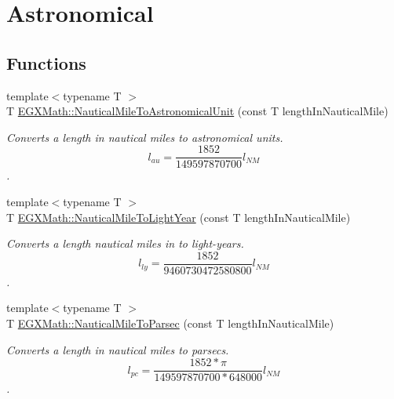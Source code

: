 \hypertarget{group___e_g_x_math-_conversions-_length_conversions-_nautical-_nautical_mile-_astronomical}{}\section{Astronomical}
\label{group___e_g_x_math-_conversions-_length_conversions-_nautical-_nautical_mile-_astronomical}
\subsection*{Functions}
\begin{DoxyCompactItemize}
\item 
{\footnotesize template$<$typename T $>$ }\\T \mbox{\hyperlink{group___e_g_x_math-_conversions-_length_conversions-_nautical-_nautical_mile-_astronomical_ga637834e348d5ca8b121204dcff671e7d}{E\+G\+X\+Math\+::\+Nautical\+Mile\+To\+Astronomical\+Unit}} (const T length\+In\+Nautical\+Mile)
\begin{DoxyCompactList}\small\item\em Converts a length in nautical miles to astronomical units. \[ l_{au}= \frac{1852}{149597870700} l_{NM} \]. \end{DoxyCompactList}\item 
{\footnotesize template$<$typename T $>$ }\\T \mbox{\hyperlink{group___e_g_x_math-_conversions-_length_conversions-_nautical-_nautical_mile-_astronomical_ga895ab2142f00d16718fa0297d076caa3}{E\+G\+X\+Math\+::\+Nautical\+Mile\+To\+Light\+Year}} (const T length\+In\+Nautical\+Mile)
\begin{DoxyCompactList}\small\item\em Converts a length nautical miles in to light-\/years. \[ l_{ly}= \frac{1852}{9460730472580800} l_{NM} \]. \end{DoxyCompactList}\item 
{\footnotesize template$<$typename T $>$ }\\T \mbox{\hyperlink{group___e_g_x_math-_conversions-_length_conversions-_nautical-_nautical_mile-_astronomical_ga9ef59718174cef0ecf43e8eff8b961fe}{E\+G\+X\+Math\+::\+Nautical\+Mile\+To\+Parsec}} (const T length\+In\+Nautical\+Mile)
\begin{DoxyCompactList}\small\item\em Converts a length in nautical miles to parsecs. \[ l_{pc}=\frac{1852 * \pi}{149597870700 * 648000} l_{NM} \]. \end{DoxyCompactList}\end{DoxyCompactItemize}


